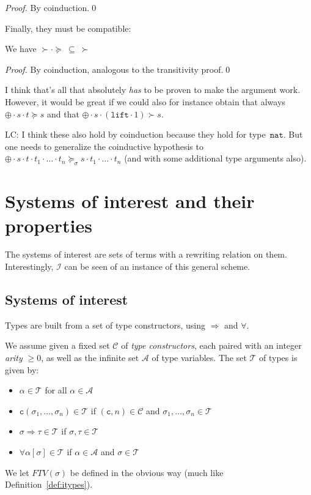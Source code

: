 \documentclass[runningheads,a4paper]{llncs}
\newcommand{\Iterms}{\mathcal{I}}
\newcommand{\Typevars}{\mathcal{A}}
\newcommand{\Types}{\mathcal{T}}
\newcommand{\TypeConstructors}{\mathcal{C}}
\newcommand{\quant}[2]{\forall #1[#2]}
\newcommand{\arrtype}{\Rightarrow}
\newcommand{\app}[2]{#1 \cdot #2}
\newcommand{\FTV}{\mathit{FTV}}
\newcommand{\nat}{\mathtt{nat}}
\newcommand{\lift}{\mathtt{lift}}
\newcommand{\con}{\mathtt{c}}
\begin{document}
\begin{proof}
  By coinduction.\qed
\end{proof}

Finally, they must be compatible:

\begin{lemma}
We have $\succ \cdot \succeq\ \subseteq\ \succ$
\end{lemma}

\begin{proof}
By coinduction, analogous to the transitivity proof.\qed
\end{proof}

I think that's all that absolutely \emph{has} to be proven to make the
argument work.  However, it would be great if we could also for
instance obtain that always $\app{\app{\oplus}{s}}{t} \succeq s$ and
that $\app{\app{\oplus}{s}}{(\app{\lift}{1})} \succ s$.

LC: I think these also hold by coinduction because they hold for
type~$\nat$. But one needs to generalize the coinductive hypothesis to
$\app{\app{\oplus}{s}}{t} \cdot t_1 \cdot \ldots \cdot t_n
\succeq_\sigma s \cdot t_1 \cdot \ldots \cdot t_n$ (and with some
additional type arguments also).

\section{Systems of interest and their properties}

The systems of interest are sets of terms with a rewriting relation on
them.  Interestingly, $\Iterms$ can be seen of an instance of this general
scheme.

\subsection{Systems of interest}

Types are built from a set of type constructors, using $\arrtype$ and
$\forall$.

\begin{definition}
We assume given a fixed set $\TypeConstructors$ of \emph{type
constructors}, each paired with an integer \emph{arity} $\geq 0$, as
well as the infinite set $\Typevars$ of type variables.  The set
$\Types$ of types is given by:
\begin{itemize}
\item $\alpha \in \Types$ for all $\alpha \in \Typevars$
\item $\con(\sigma_1,\dots,\sigma_n) \in \Types$ if $(\con,n) \in
  \TypeConstructors$ and $\sigma_1,\dots,\sigma_n \in \Types$
\item $\sigma \arrtype \tau \in \Types$ if $\sigma,\tau \in \Types$
\item $\quant{\alpha}{\sigma} \in \Types$ if $\alpha \in \Typevars$ and
  $\sigma \in \Types$
\end{itemize}
We let $\FTV(\sigma)$ be defined in the obvious way (much like
Definition~\ref{def:itypes}).
\end{definition}
\end{document}

